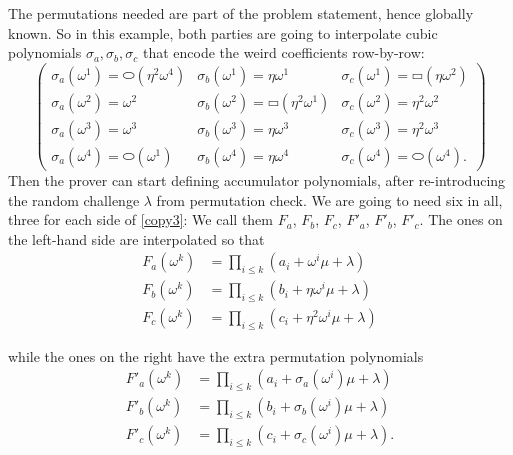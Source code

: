The permutations needed are part of the problem statement, hence
globally known. So in this example, both parties are going to
interpolate cubic polynomials \(\sigma_{a},\sigma_{b},\sigma_{c}\) that
encode the weird coefficients row-by-row: \[\begin{pmatrix}
\sigma_{a}\left( \omega^{1} \right) = {⬭({\eta^{2}\omega^{4}})} & \sigma_{b}\left( \omega^{1} \right) = \eta\omega^{1} & \sigma_{c}\left( \omega^{1} \right) = {▭({\eta\omega^{2}})} \\
\sigma_{a}\left( \omega^{2} \right) = \omega^{2} & \sigma_{b}\left( \omega^{2} \right) = {▭({\eta^{2}\omega^{1}})} & \sigma_{c}\left( \omega^{2} \right) = \eta^{2}\omega^{2} \\
\sigma_{a}\left( \omega^{3} \right) = \omega^{3} & \sigma_{b}\left( \omega^{3} \right) = \eta\omega^{3} & \sigma_{c}\left( \omega^{3} \right) = \eta^{2}\omega^{3} \\
\sigma_{a}\left( \omega^{4} \right) = {⬭(\omega^{1})} & \sigma_{b}\left( \omega^{4} \right) = \eta\omega^{4} & \sigma_{c}\left( \omega^{4} \right) = {⬭(\omega^{4})}.
\end{pmatrix}\] Then the prover can start defining accumulator
polynomials, after re-introducing the random challenge \(\lambda\) from
permutation check. We are going to need six in all, three for each side
of \hyperref[copy3]{{[}copy3{]}}: We call them \(F_{a}\), \(F_{b}\),
\(F_{c}\), \(F'_{a}\), \(F'_{b}\), \(F'_{c}\). The ones on the left-hand
side are interpolated so that \[\begin{aligned}
F_{a}\left( \omega^{k} \right) & = \prod_{i \leq k}\left( a_{i} + \omega^{i}\mu + \lambda \right) \\
F_{b}\left( \omega^{k} \right) & = \prod_{i \leq k}\left( b_{i} + \eta\omega^{i}\mu + \lambda \right) \\
F_{c}\left( \omega^{k} \right) & = \prod_{i \leq k}\left( c_{i} + \eta^{2}\omega^{i}\mu + \lambda \right)
\end{aligned}\] \label{copycheck-left}{}

while the ones on the right have the extra permutation polynomials
\[\begin{aligned}
F'_{a}\left( \omega^{k} \right) & = \prod_{i \leq k}\left( a_{i} + \sigma_{a}\left( \omega^{i} \right)\mu + \lambda \right) \\
F'_{b}\left( \omega^{k} \right) & = \prod_{i \leq k}\left( b_{i} + \sigma_{b}\left( \omega^{i} \right)\mu + \lambda \right) \\
F'_{c}\left( \omega^{k} \right) & = \prod_{i \leq k}\left( c_{i} + \sigma_{c}\left( \omega^{i} \right)\mu + \lambda \right).
\end{aligned}\] \label{copycheck-right}{}

